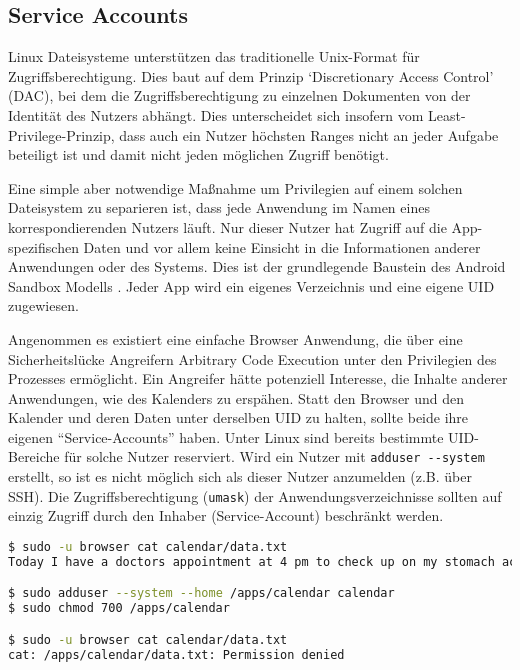 \subsection{Service Accounts}
\label{sec:service-acc} 

Linux Dateisysteme unterstützen das traditionelle Unix-Format für Zugriffsberechtigung. Dies baut auf dem Prinzip `Discretionary Access Control' (DAC), bei dem die Zugriffsberechtigung zu einzelnen Dokumenten von der Identität des Nutzers abhängt. Dies unterscheidet sich insofern vom Least-Privilege-Prinzip, dass auch ein Nutzer höchsten Ranges nicht an jeder Aufgabe beteiligt ist und damit nicht jeden möglichen Zugriff benötigt.

Eine simple aber notwendige Maßnahme um Privilegien auf einem solchen Dateisystem zu separieren ist, dass jede Anwendung im Namen eines korrespondierenden Nutzers läuft. Nur dieser Nutzer hat Zugriff auf die App-spezifischen Daten und vor allem keine Einsicht in die Informationen anderer Anwendungen oder des Systems. Dies ist der grundlegende Baustein des Android Sandbox Modells \cite{android-sandbox}. Jeder App wird ein eigenes Verzeichnis und eine eigene UID zugewiesen.

Angenommen es existiert eine einfache Browser Anwendung, die über eine Sicherheitslücke Angreifern Arbitrary Code Execution unter den Privilegien des Prozesses ermöglicht. Ein Angreifer hätte potenziell Interesse, die Inhalte anderer Anwendungen, wie des Kalenders zu erspähen.
Statt den Browser und den Kalender und deren Daten unter derselben UID zu halten, sollte beide ihre eigenen ``Service-Accounts'' haben. Unter Linux sind bereits bestimmte UID-Bereiche für solche Nutzer reserviert. Wird ein Nutzer mit \texttt{adduser -{}-system} erstellt, so ist es nicht möglich sich als dieser Nutzer anzumelden (z.B. über SSH). Die Zugriffsberechtigung (\texttt{umask}) der Anwendungsverzeichnisse sollten auf einzig Zugriff durch den Inhaber (Service-Account) beschränkt werden.

\begin{lstlisting}[language=bash]
$ sudo -u browser cat calendar/data.txt
Today I have a doctors appointment at 4 pm to check up on my stomach aches.

$ sudo adduser --system --home /apps/calendar calendar
$ sudo chmod 700 /apps/calendar

$ sudo -u browser cat calendar/data.txt
cat: /apps/calendar/data.txt: Permission denied
\end{lstlisting}


